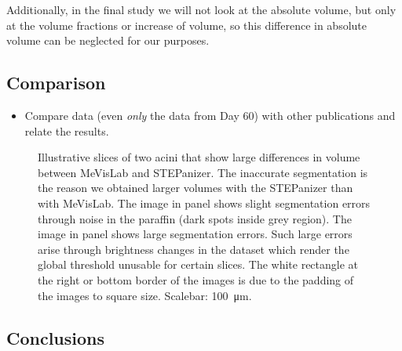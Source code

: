 \documentclass[%
	paper=a4,%
	abstract=true,%
	]{scrartcl}
\newcommand{\imsize}{\linewidth}
\begin{document}
Additionally, in the final study we will not look at the absolute volume, but only at the volume fractions or increase of volume, so this difference in absolute volume can be neglected for our purposes.

\subsection{Comparison}
\begin{itemize}
	\item Compare data (even \emph{only} the data from Day 60) with other publications and relate the results.
\end{itemize} 

\renewcommand{\imsize}{0.495\linewidth}%
\setlength\fboxsep{0pt}%
\begin{figure}[htb]
	\centering
	\hfill%
	\caption{Illustrative slices of two acini that show large differences in volume between MeVisLab and STEPanizer. The inaccurate segmentation is the reason we obtained larger volumes with the STEPanizer than with MeVisLab. The image in panel  shows slight segmentation errors through noise in the paraffin (dark spots inside grey region). The image in panel  shows large segmentation errors. Such large errors arise through brightness changes in the dataset which render the global threshold unusable for certain slices. The white rectangle at the right or bottom border of the images is due to the padding of the images to square size. Scalebar: \SI{100}{\micro\meter}.}
	\label{fig:MeVisSegmentation}
\end{figure}

\subsection{Conclusions}
\end{document}
